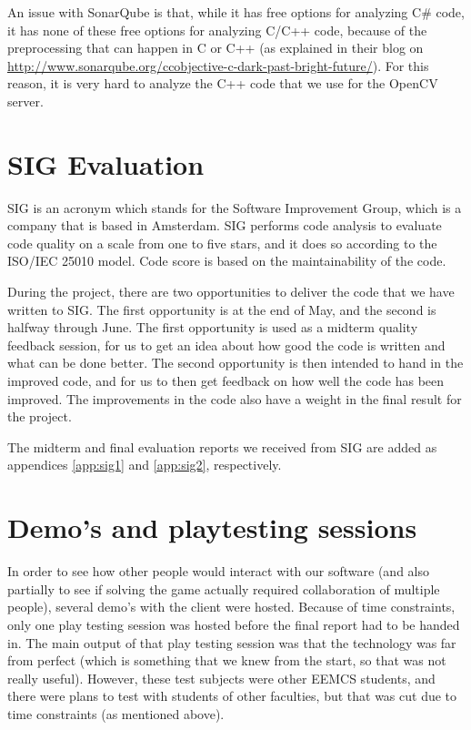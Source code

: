 		An issue with SonarQube is that, while it has free options for analyzing
		C\# code, it has none of these free options for analyzing C/C++ code,
		because of the preprocessing that can happen in C or C++ (as explained
		in their blog on \url{http://www.sonarqube.org/ccobjective-c-dark-past-bright-future/}).
		For this reason, it is very hard to analyze the C++ code that we use for the
		OpenCV server.
		
	\section{SIG Evaluation} \label{sec:sigevaluation}
		SIG is an acronym which stands for the Software Improvement Group,
		which is a company that is based in Amsterdam. SIG performs code
		analysis to evaluate code quality on a scale from one to five stars,
		and it does so according to the ISO/IEC 25010 model. Code score is 
		based on the maintainability of the code.
		
		During the project, there are two opportunities to deliver the code 
		that we have written to SIG. The first opportunity is at the end of 
		May, and the second is halfway through June. The first opportunity 
		is used as a midterm quality feedback session, for us to get an idea 
		about how good the code is written and what can be done better. The 
		second opportunity is then intended to hand in the improved code, 
		and for us to then get feedback on how well the code has been improved. 
		The improvements in the code also have a weight in the final result 
		for the project.
		
		The midterm and final evaluation reports we received from SIG are added
		as appendices \ref{app:sig1} and \ref{app:sig2}, respectively.
		
	\section{Demo's and playtesting sessions} \label{sec:demos}
		In order to see how other people would interact with our software (and
		also partially to see if solving the game actually required collaboration
		of multiple people), several demo's with the client were hosted. Because 
		of time constraints, only one play testing session was hosted before
		the final report had to be handed in. The main output of that play
		testing session was that the technology was far from perfect (which
		is something that we knew from the start, so that was not really useful).
		However, these test subjects were other EEMCS students, and there
		were plans to test with students of other faculties, but that was
		cut due to time constraints (as mentioned above).
		
